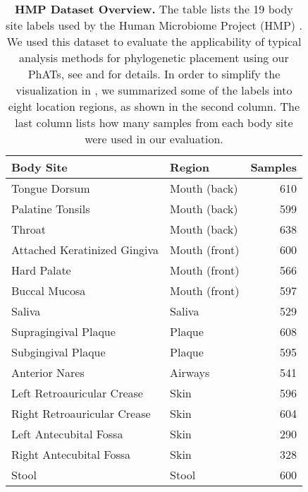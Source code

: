 \begin{table}[htb]
\caption[HMP Dataset Overview]{
\textbf{HMP Dataset Overview.}
The table lists the 19 body site labels used by the Human Microbiome Project (HMP) \citep{Huttenhower2012,Methe2012}.
We used this dataset to evaluate the applicability of typical analysis methods for phylogenetic placement
using our \acp{PhAT},
see  and  for details.
In order to simplify the visualization in ,
we summarized some of the labels into eight location regions, as shown in the second column.
The last column lists how many samples from each body site were used in our evaluation.
}
\label{tab:hmp_data_overview}
{
    \begin{center}
    \begin{tabular}{llr}
        \toprule
        Body Site                       & Region            & Samples   \\
        \midrule
        Tongue Dorsum                   & Mouth (back)      & 610   \\
        Palatine Tonsils                & Mouth (back)      & 599   \\
        Throat                          & Mouth (back)      & 638   \\
        Attached Keratinized Gingiva    & Mouth (front)     & 600   \\
        Hard Palate                     & Mouth (front)     & 566   \\
        Buccal Mucosa                   & Mouth (front)     & 597   \\
        Saliva                          & Saliva            & 529   \\
        Supragingival Plaque            & Plaque            & 608   \\
        Subgingival Plaque              & Plaque            & 595   \\
        Anterior Nares                  & Airways           & 541   \\
        Left Retroauricular Crease      & Skin              & 596   \\
        Right Retroauricular Crease     & Skin              & 604   \\
        Left Antecubital Fossa          & Skin              & 290   \\
        Right Antecubital Fossa         & Skin              & 328   \\
        Stool                           & Stool             & 600   \\

\end{tabular}
\end{center}}
\end{table}
